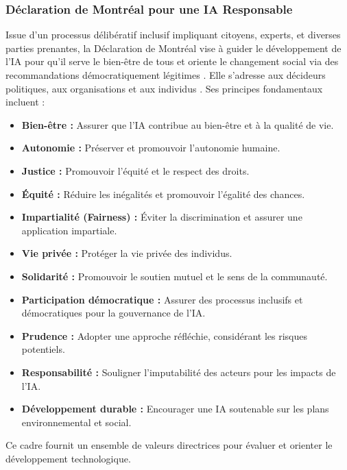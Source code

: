 \documentclass[10pt, twocolumn]{article}
\begin{document}
\subsubsection{Déclaration de Montréal pour une IA Responsable}
Issue d'un processus délibératif inclusif impliquant citoyens, experts, et diverses parties prenantes, la Déclaration de Montréal vise à guider le développement de l'IA pour qu'il serve le bien-être de tous et oriente le changement social via des recommandations démocratiquement légitimes \citep{Montreal2018}. Elle s'adresse aux décideurs politiques, aux organisations et aux individus \citep{Montreal2018}. Ses principes fondamentaux incluent \citep{Montreal2018} :
\begin{itemize}
    \item \textbf{Bien-être :} Assurer que l'IA contribue au bien-être et à la qualité de vie.
    \item \textbf{Autonomie :} Préserver et promouvoir l'autonomie humaine.
    \item \textbf{Justice :} Promouvoir l'équité et le respect des droits.
    \item \textbf{Équité :} Réduire les inégalités et promouvoir l'égalité des chances.
    \item \textbf{Impartialité (Fairness) :} Éviter la discrimination et assurer une application impartiale.
    \item \textbf{Vie privée :} Protéger la vie privée des individus.
    \item \textbf{Solidarité :} Promouvoir le soutien mutuel et le sens de la communauté.
    \item \textbf{Participation démocratique :} Assurer des processus inclusifs et démocratiques pour la gouvernance de l'IA.
    \item \textbf{Prudence :} Adopter une approche réfléchie, considérant les risques potentiels.
    \item \textbf{Responsabilité :} Souligner l'imputabilité des acteurs pour les impacts de l'IA.
    \item \textbf{Développement durable :} Encourager une IA soutenable sur les plans environnemental et social.
\end{itemize}
Ce cadre fournit un ensemble de valeurs directrices pour évaluer et orienter le développement technologique.
\end{document}
